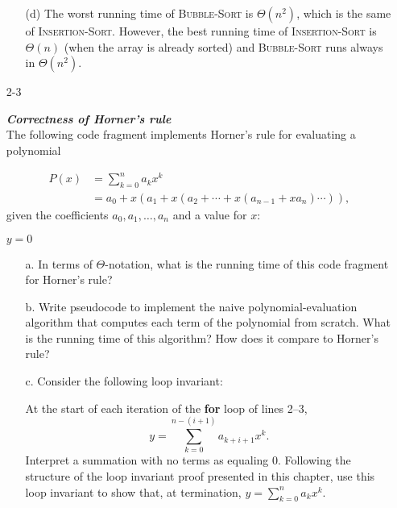 \documentclass{report}
\makeatletter
\renewenvironment{framed}{%
 \def\FrameCommand##1{\hskip\@totalleftmargin
 \fboxsep=\FrameSep\fbox{##1}}%
 \MakeFramed {\advance\hsize-\width
   \@totalleftmargin\z@ \linewidth\hsize
   \@setminipage}}%
 {\par\unskip\endMakeFramed}
\makeatother
\begin{document}
\begin{enumerate}
\begin{framed}
\begin{enumerate}
\item [(d)] The worst running time of \textsc{Bubble-Sort} is $\Theta(n^2)$,
which is the same of \textsc{Insertion-Sort}. However, the best running time of
\textsc{Insertion-Sort} is $\Theta(n)$ (when the array is already sorted) and
\textsc{Bubble-Sort} runs always in $\Theta(n^2)$.
\end{enumerate}

\end{framed}

\item[2{-}3]{\textbf{\emph{Correctness of Horner's rule}}\\
The following code fragment implements Horner's rule for evaluating a polynomial

\begin{equation*}
\begin{split}
  P(x) & = \sum_{k=0}^{n}{a_k x^k}\\
       & = a_0 + x(a_1 + x(a_2 + \cdots + x(a_{n - 1} + x a_n) \cdots)),
\end{split}
\end{equation*}
given the coefficients $a_0, a_1, \dots, a_n$ and a value for $x$:

\begin{algorithm}[H]
\SetAlgoNoEnd\DontPrintSemicolon%
\nl $y = 0$\;
\nl {}
\end{algorithm}

\begin{enumerate}
\item[a.] In terms of $\Theta$-notation, what is the running time of this code
fragment for Horner's rule?

\item[b.] Write pseudocode to implement the naive polynomial-evaluation
algorithm that computes each term of the polynomial from scratch. What is the
running time of this algorithm? How does it compare to Horner's rule?

\item[c.] Consider the following loop invariant:

At the start of each iteration of the \textbf{for} loop of lines 2{--}3,
\begin{equation*}
  y = \sum_{k = 0}^{n - (i + 1)}{a_{k + i + 1} x^k}.
\end{equation*}
Interpret a summation with no terms as equaling 0. Following the structure of
the loop invariant proof presented in this chapter, use this loop invariant
to show that, at termination, $y = \sum_{k = 0}^n{a_k x^k}$.


\end{enumerate}}
\end{enumerate}
\end{document}
